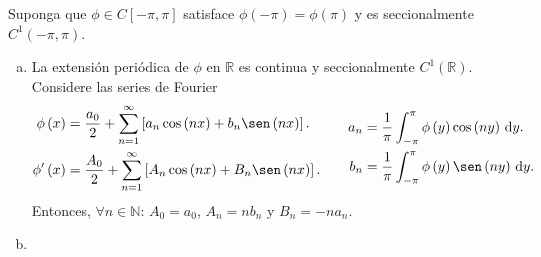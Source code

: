 \begin{theorem}
    Suponga que $\phi\in C\left[-\pi,\pi\right]$  satisface
    $\phi\left(-\pi\right)=\phi\left(\pi\right)$ y es
    seccionalmente $C^{1}\left(-\pi,\pi\right)$.
    \begin{enumerate}[(a)]
        \item

              La extensión periódica de $\phi$ en $\mathbb{R}$ es
              continua y seccionalmente
              $C^{1}\left(\mathbb{R}\right)$.
              Considere las series de Fourier
              \begin{equation*}
                  \begin{aligned}
                      \phi\left(x\right)          & =
                      \frac{a_{0}}{2}+
                      \sum_{n=1}^{\infty}
                      \left[
                          a_{n}
                          \cos\left(nx\right)+
                          b_{n}
                          \sen\left(nx\right)
                      \right].                        \\
                      \phi^{\prime}\left(x\right) & =
                      \frac{A_{0}}{2}+
                      \sum_{n=1}^{\infty}
                      \left[
                          A_{n}
                          \cos\left(nx\right)+
                          B_{n}
                          \sen\left(nx\right)
                          \right].
                  \end{aligned}\qquad
                  \begin{aligned}
                      a_{n} & =
                      \frac{1}{\pi}
                      \int_{-\pi}^{\pi}
                      \phi\left(y\right)
                      \cos\left(ny\right)\dl y. \\
                      b_{n} & =
                      \frac{1}{\pi}
                      \int_{-\pi}^{\pi}
                      \phi\left(y\right)
                      \sen\left(ny\right)\dl y.
                  \end{aligned}
              \end{equation*}
              Entonces, $\forall n\in\mathbb{N}$: $A_{0}=a_{0}$,
              $A_{n}=nb_{n}$ y $B_{n}=-na_{n}$.

        \item


\end{enumerate}
\end{theorem}
